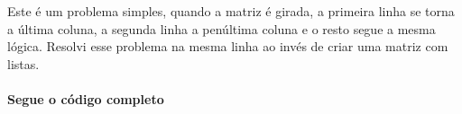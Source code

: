 \par Este é um problema simples, quando a matriz é girada, a primeira linha se torna a última coluna, a segunda linha a penúltima coluna e o resto segue a mesma lógica.
Resolvi esse problema na mesma linha ao invés de criar uma matriz com listas. 
\paragraph{Segue o código completo}
\begin{mdframed}[linewidth=0pt,backgroundcolor=codebgcolor]
    \inputminted[breaklines]{python}{../src/encodedmessage/encodedmessage.py}
\end{mdframed}